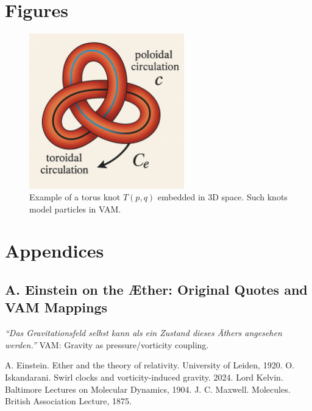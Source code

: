 \documentclass[12pt]{article}
\begin{document}
    \section*{Figures}
    \begin{figure}[h!]
        \centering
        \includegraphics[width=0.6\textwidth]{../images/ChatGPT}
        \caption{Example of a torus knot $T(p,q)$ embedded in 3D space. Such knots model particles in VAM.}
    \end{figure}

    \section*{Appendices}
    \subsection*{A. Einstein on the Æther: Original Quotes and VAM Mappings}
    \textit{“Das Gravitationsfeld selbst kann als ein Zustand dieses Äthers angesehen werden.”} \rightarrow VAM: Gravity as pressure/vorticity coupling.

    
    \begin{thebibliography}{10}
         A. Einstein. Ether and the theory of relativity. University of Leiden, 1920.
         O. Iskandarani. Swirl clocks and vorticity-induced gravity. 2024.
         Lord Kelvin. Baltimore Lectures on Molecular Dynamics, 1904.
         J. C. Maxwell. Molecules. British Association Lecture, 1875.
    \end{thebibliography}
\end{document}
